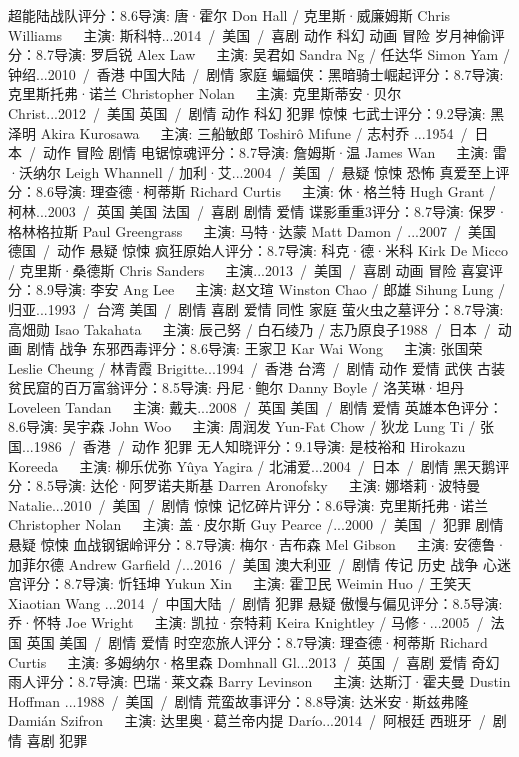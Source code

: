 超能陆战队评分：8.6导演: 唐·霍尔 Don Hall / 克里斯·威廉姆斯 Chris Williams   主演: 斯科特...2014 / 美国 / 喜剧 动作 科幻 动画 冒险
岁月神偷评分：8.7导演: 罗启锐 Alex Law   主演: 吴君如 Sandra Ng / 任达华 Simon Yam / 钟绍...2010 / 香港 中国大陆 / 剧情 家庭
蝙蝠侠：黑暗骑士崛起评分：8.7导演: 克里斯托弗·诺兰 Christopher Nolan   主演: 克里斯蒂安·贝尔 Christ...2012 / 美国 英国 / 剧情 动作 科幻 犯罪 惊悚
七武士评分：9.2导演: 黑泽明 Akira Kurosawa   主演: 三船敏郎 Toshirô Mifune / 志村乔 ...1954 / 日本 / 动作 冒险 剧情
电锯惊魂评分：8.7导演: 詹姆斯·温 James Wan   主演: 雷·沃纳尔 Leigh Whannell / 加利·艾...2004 / 美国 / 悬疑 惊悚 恐怖
真爱至上评分：8.6导演: 理查德·柯蒂斯 Richard Curtis   主演: 休·格兰特 Hugh Grant / 柯林...2003 / 英国 美国 法国 / 喜剧 剧情 爱情
谍影重重3评分：8.7导演: 保罗·格林格拉斯 Paul Greengrass   主演: 马特·达蒙 Matt Damon / ...2007 / 美国 德国 / 动作 悬疑 惊悚
疯狂原始人评分：8.7导演: 科克·德·米科 Kirk De Micco / 克里斯·桑德斯 Chris Sanders   主演...2013 / 美国 / 喜剧 动画 冒险
喜宴评分：8.9导演: 李安 Ang Lee   主演: 赵文瑄 Winston Chao / 郎雄 Sihung Lung / 归亚...1993 / 台湾 美国 / 剧情 喜剧 爱情 同性 家庭
萤火虫之墓评分：8.7导演: 高畑勋 Isao Takahata   主演: 辰己努 / 白石绫乃 / 志乃原良子1988 / 日本 / 动画 剧情 战争
东邪西毒评分：8.6导演: 王家卫 Kar Wai Wong   主演: 张国荣 Leslie Cheung / 林青霞 Brigitte...1994 / 香港 台湾 / 剧情 动作 爱情 武侠 古装
贫民窟的百万富翁评分：8.5导演: 丹尼·鲍尔 Danny Boyle / 洛芙琳·坦丹 Loveleen Tandan   主演: 戴夫...2008 / 英国 美国 / 剧情 爱情
英雄本色评分：8.6导演: 吴宇森 John Woo   主演: 周润发 Yun-Fat Chow / 狄龙 Lung Ti / 张国...1986 / 香港 / 动作 犯罪
无人知晓评分：9.1导演: 是枝裕和 Hirokazu Koreeda   主演: 柳乐优弥 Yûya Yagira / 北浦爱...2004 / 日本 / 剧情
黑天鹅评分：8.5导演: 达伦·阿罗诺夫斯基 Darren Aronofsky   主演: 娜塔莉·波特曼 Natalie...2010 / 美国 / 剧情 惊悚
记忆碎片评分：8.6导演: 克里斯托弗·诺兰 Christopher Nolan   主演: 盖·皮尔斯 Guy Pearce /...2000 / 美国 / 犯罪 剧情 悬疑 惊悚
血战钢锯岭评分：8.7导演: 梅尔·吉布森 Mel Gibson   主演: 安德鲁·加菲尔德 Andrew Garfield /...2016 / 美国 澳大利亚 / 剧情 传记 历史 战争
心迷宫评分：8.7导演: 忻钰坤 Yukun Xin   主演: 霍卫民 Weimin Huo / 王笑天 Xiaotian Wang ...2014 / 中国大陆 / 剧情 犯罪 悬疑
傲慢与偏见评分：8.5导演: 乔·怀特 Joe Wright   主演: 凯拉·奈特莉 Keira Knightley / 马修·...2005 / 法国 英国 美国 / 剧情 爱情
时空恋旅人评分：8.7导演: 理查德·柯蒂斯 Richard Curtis   主演: 多姆纳尔·格里森 Domhnall Gl...2013 / 英国 / 喜剧 爱情 奇幻
雨人评分：8.7导演: 巴瑞·莱文森 Barry Levinson   主演: 达斯汀·霍夫曼 Dustin Hoffman ...1988 / 美国 / 剧情
荒蛮故事评分：8.8导演: 达米安·斯兹弗隆 Damián Szifron   主演: 达里奥·葛兰帝内提 Darío...2014 / 阿根廷 西班牙 / 剧情 喜剧 犯罪
